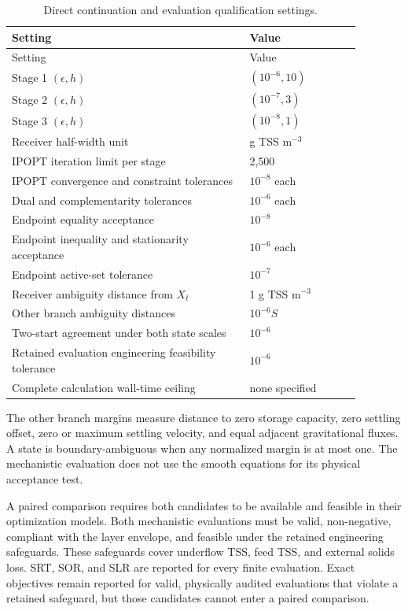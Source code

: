 \documentclass[a4paper,fleqn]{cas-sc}
\begin{document}
\begin{longtable}{p{0.60\linewidth}p{0.28\linewidth}}
\caption{Direct continuation and evaluation qualification settings.}\label{tab:Sdirect}\\
\toprule
Setting & Value\\
\midrule
\endfirsthead
\toprule
Setting & Value\\
\midrule
\endhead
Stage 1 $(\epsilon,h)$ & $(10^{-6},10)$\\
Stage 2 $(\epsilon,h)$ & $(10^{-7},3)$\\
Stage 3 $(\epsilon,h)$ & $(10^{-8},1)$\\
Receiver half-width unit & g TSS m$^{-3}$\\
IPOPT iteration limit per stage & 2,500\\
IPOPT convergence and constraint tolerances & $10^{-8}$ each\\
Dual and complementarity tolerances & $10^{-6}$ each\\
Endpoint equality acceptance & $10^{-8}$\\
Endpoint inequality and stationarity acceptance & $10^{-6}$ each\\
Endpoint active-set tolerance & $10^{-7}$\\
Receiver ambiguity distance from $X_t$ & 1 g TSS m$^{-3}$\\
Other branch ambiguity distances & $10^{-6}S$\\
Two-start agreement under both state scales & $10^{-6}$\\
Retained evaluation engineering feasibility tolerance & $10^{-6}$\\
Complete calculation wall-time ceiling & none specified\\
\bottomrule
\end{longtable}

The other branch margins measure distance to zero storage capacity, zero settling offset, zero or maximum settling velocity, and equal adjacent gravitational fluxes. A state is boundary-ambiguous when any normalized margin is at most one. The mechanistic evaluation does not use the smooth equations for its physical acceptance test.

A paired comparison requires both candidates to be available and feasible in their optimization models. Both mechanistic evaluations must be valid, non-negative, compliant with the layer envelope, and feasible under the retained engineering safeguards. These safeguards cover underflow TSS, feed TSS, and external solids loss. SRT, SOR, and SLR are reported for every finite evaluation. Exact objectives remain reported for valid, physically audited evaluations that violate a retained safeguard, but those candidates cannot enter a paired comparison.
\end{document}
